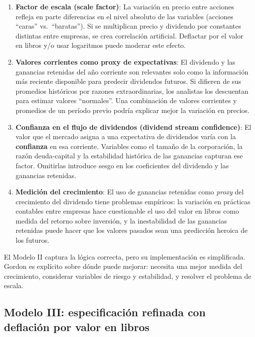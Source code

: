 \documentclass[12pt]{article}
\begin{document}
\begin{enumerate}
  \item \textbf{Factor de escala (scale factor)}: La variaci\'on en precio entre acciones refleja en parte diferencias en el nivel absoluto de las variables (acciones ``caras'' vs.~``baratas''). Si se multiplican precio y dividendo por constantes distintas entre empresas, se crea correlaci\'on artificial. Deflactar por el valor en libros y/o usar logaritmos puede moderar este efecto.

  \item \textbf{Valores corrientes como proxy de expectativas}: El dividendo y las ganancias retenidas del a\~no corriente son relevantes solo como la informaci\'on m\'as reciente disponible para predecir dividendos futuros. Si difieren de sus promedios hist\'oricos por razones extraordinarias, los analistas los descuentan para estimar valores ``normales''. Una combinaci\'on de valores corrientes y promedios de un per\'iodo previo podr\'ia explicar mejor la variaci\'on en precios.

  \item \textbf{Confianza en el flujo de dividendos (dividend stream confidence)}: El valor que el mercado asigna a una expectativa de dividendos var\'ia con la \textbf{confianza} en esa corriente. Variables como el tama\~no de la corporaci\'on, la raz\'on deuda-capital y la estabilidad hist\'orica de las ganancias capturan ese factor. Omitirlas introduce sesgo en los coeficientes del dividendo y las ganancias retenidas.

  \item \textbf{Medici\'on del crecimiento}: El uso de ganancias retenidas como \textit{proxy} del crecimiento del dividendo tiene problemas emp\'iricos: la variaci\'on en pr\'acticas contables entre empresas hace cuestionable el uso del valor en libros como medida del retorno sobre inversi\'on, y la inestabilidad de las ganancias retenidas puede hacer que los valores pasados sean una predicci\'on heroica de los futuros.
\end{enumerate}

\begin{intuicion}
El Modelo II captura la l\'ogica correcta, pero su implementaci\'on es simplificada. Gordon es explícito sobre d\'onde puede mejorar: necesita una mejor medida del crecimiento, considerar variables de riesgo y estabilidad, y resolver el problema de escala.
\end{intuicion}

\subsection{Modelo III: especificaci\'on refinada con deflaci\'on por valor en libros}
\end{document}
